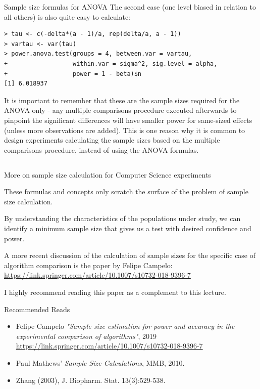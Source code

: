 

\begin{frame}[fragile]{Sample size formulas for ANOVA}
The second case (one level biased in relation to all others) is also quite easy to calculate:

{\smaller
\begin{verbatim}
> tau <- c(-delta*(a - 1)/a, rep(delta/a, a - 1))
> vartau <- var(tau)
> power.anova.test(groups = 4, between.var = vartau,
+                  within.var = sigma^2, sig.level = alpha,
+                  power = 1 - beta)$n
[1] 6.018937
\end{verbatim}}

It is important to remember that these are the sample sizes required for the ANOVA only - any multiple comparisons procedure executed afterwards to pinpoint the significant differences will have smaller power for same-sized effects (unless more observations are added). This is one reason why it is common to design experiments calculating the sample sizes based on the multiple comparisons procedure, instead of using the ANOVA formulas.
\end{frame}

\subsection{}
\begin{frame}{More on sample size calculation for Computer Science experiments}

  These formulas and concepts only scratch the surface of the problem of sample size calculation. \bigskip

  By understanding the characteristics of the populations under study, we can identify a minimum sample size that gives us a test with desired confidence and power.\bigskip

  A more recent discussion of the calculation of sample sizes for the specific case of algorithm comparison is the paper by Felipe Campelo:\\
  \url{https://link.springer.com/article/10.1007/s10732-018-9396-7}\bigskip

  I highly recommend reading this paper as a complement to this lecture.
\end{frame}

\begin{frame}{Recommended Reads}
  \begin{itemize}
    \item Felipe Campelo \emph{"Sample size estimation for power and accuracy in the experimental comparison of algorithms"}, 2019
    \url{https://link.springer.com/article/10.1007/s10732-018-9396-7}
    \item Paul Mathews' \textit{Sample Size Calculations}, MMB, 2010.
    \item Zhang (2003), J. Biopharm. Stat. 13(3):529-538.
  \end{itemize}
\end{frame}
